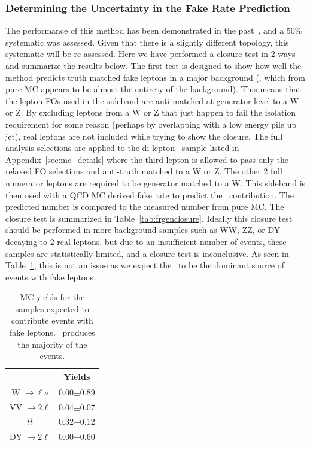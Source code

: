 \subsubsection{Determining the Uncertainty in the Fake Rate Prediction}
The performance of this method has been demonstrated in the past~\cite{sspaper2011}, and a 50\% systematic was assessed. Given that there is a slightly different topology, this systematic will be re-assessed. Here we have performed a closure test in 2 ways and summarize the results below. The first test is designed to show how well the method predicts truth matched fake leptons in a major background (\ttbar, which from pure MC appears to be almost the entirety of the background). This means that the lepton FOs used in the sideband are anti-matched at generator level to a W or Z. By excluding leptons from a W or Z that just happen to fail the isolation requirement for some reason (perhaps by overlapping with a low energy pile up jet), real leptons are not included while trying to show the closure. The full analysis selections are applied to the di-lepton \ttbar \ sample listed in Appendix~\ref{sec:mc_details} where the third lepton is allowed to pass only the relaxed FO selections and anti-truth matched to a W or Z. The other 2 full numerator leptons are required to be generator matched to a W. This sideband is then used with a QCD MC derived fake rate to predict the \ttbar \ contribution. The predicted number is compared to the measured number from pure MC. The closure test is summarized in Table~\ref{tab:frgenclosure}. Ideally this closure test should be performed in more background samples such as WW, ZZ, or DY decaying to 2 real leptons, but due to an insufficient number of events, these samples are statistically limited, and a closure test is inconclusive. As seen in Table~\ref{tab:fakeMCYields}, this is not an issue as we expect the \ttbar \ to be the dominant source of events with fake leptons.\\


\begin{table}[ht!]
\begin{center}
\caption{\small \label{tab:fakeMCYields} MC yields for the samples expected to contribute events with fake leptons. \ttbar \ produces the majority of the events.}
\begin{tabular}{c|c}\hline
&Yields\\
\hline \hline
W $\rightarrow \ell \nu$ &   0.00$\pm$0.89 \\
VV $\rightarrow 2 \ell$ &    0.04$\pm$0.07 \\
$t\overline{t}$     &        0.32$\pm$0.12 \\
DY $\rightarrow 2 \ell$  &   0.00$\pm$0.60 \\
\hline
\end{tabular}
\end{center}
\end{table}


